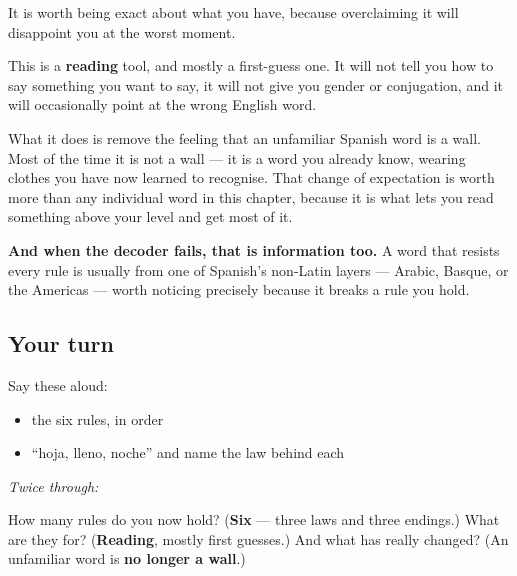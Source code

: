 \begin{grammarlens}[title={Grammar Lens: what a decoder is not}]
It is worth being exact about what you have, because overclaiming it will disappoint you at the worst moment.

This is a \textbf{reading} tool, and mostly a first-guess one. It will not tell you how to say something you want to say, it will not give you gender or conjugation, and it will occasionally point at the wrong English word.

What it does is remove the feeling that an unfamiliar Spanish word is a wall. Most of the time it is not a wall — it is a word you already know, wearing clothes you have now learned to recognise. That change of expectation is worth more than any individual word in this chapter, because it is what lets you read something above your level and get most of it.

\textbf{And when the decoder fails, that is information too.} A word that resists every rule is usually from one of Spanish's non-Latin layers — Arabic, Basque, or the Americas — worth noticing precisely because it breaks a rule you hold.
\end{grammarlens}

\subsection*{Your turn}
Say these aloud:

\begin{itemize}
\raggedright
  \item the six rules, in order
  \item \textquotedblleft{}hoja, lleno, noche\textquotedblright{} and name the law behind each
\end{itemize}

\emph{Twice through:}

\begin{tcolorbox}[breakable,colback=teal!4,colframe=teal!35!black,title={Before you move on}]
How many rules do you now hold? (\textbf{Six} — three laws and three endings.) What are they for? (\textbf{Reading}, mostly first guesses.) And what has really changed? (An unfamiliar word is \textbf{no longer a wall}.)
\end{tcolorbox}
